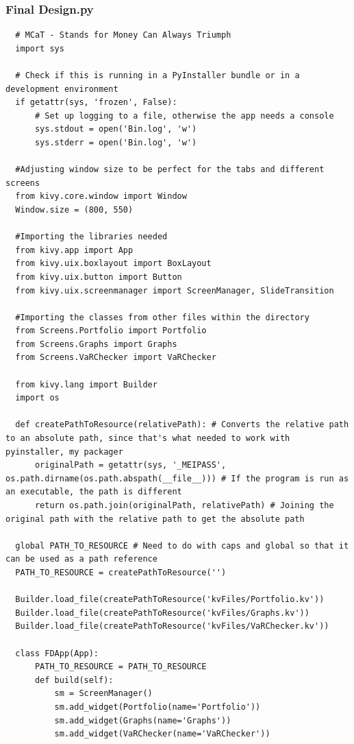 \documentclass{article}
\begin{document}
\subsubsection{Final Design.py}
\begin{verbatim}
  # MCaT - Stands for Money Can Always Triumph
  import sys

  # Check if this is running in a PyInstaller bundle or in a development environment
  if getattr(sys, 'frozen', False):
      # Set up logging to a file, otherwise the app needs a console
      sys.stdout = open('Bin.log', 'w')
      sys.stderr = open('Bin.log', 'w')

  #Adjusting window size to be perfect for the tabs and different screens
  from kivy.core.window import Window
  Window.size = (800, 550)

  #Importing the libraries needed
  from kivy.app import App
  from kivy.uix.boxlayout import BoxLayout
  from kivy.uix.button import Button
  from kivy.uix.screenmanager import ScreenManager, SlideTransition

  #Importing the classes from other files within the directory
  from Screens.Portfolio import Portfolio
  from Screens.Graphs import Graphs
  from Screens.VaRChecker import VaRChecker

  from kivy.lang import Builder
  import os

  def createPathToResource(relativePath): # Converts the relative path to an absolute path, since that's what needed to work with pyinstaller, my packager
      originalPath = getattr(sys, '_MEIPASS', os.path.dirname(os.path.abspath(__file__))) # If the program is run as an executable, the path is different
      return os.path.join(originalPath, relativePath) # Joining the original path with the relative path to get the absolute path

  global PATH_TO_RESOURCE # Need to do with caps and global so that it can be used as a path reference
  PATH_TO_RESOURCE = createPathToResource('')

  Builder.load_file(createPathToResource('kvFiles/Portfolio.kv'))
  Builder.load_file(createPathToResource('kvFiles/Graphs.kv'))
  Builder.load_file(createPathToResource('kvFiles/VaRChecker.kv'))

  class FDApp(App):
      PATH_TO_RESOURCE = PATH_TO_RESOURCE
      def build(self):
          sm = ScreenManager()        
          sm.add_widget(Portfolio(name='Portfolio'))
          sm.add_widget(Graphs(name='Graphs'))
          sm.add_widget(VaRChecker(name='VaRChecker'))


\end{verbatim}
\end{document}
